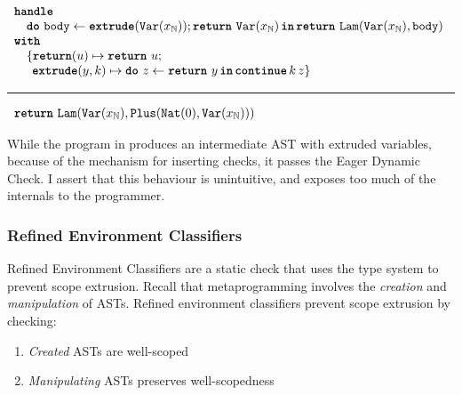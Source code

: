 \begin{code}
  \begin{efflst}
    $\begin{array}{l}
      \textbf{\texttt{handle}} \\
      \quad \texttt{\textbf{do}} \,\, {\texttt{body}} \leftarrow {\textbf{\texttt{extrude}}({\texttt{Var}(x_{\mathbb{N}})}); \texttt{\textbf{return}} \,\, {\texttt{Var}(x_{\mathbb{N}})}} \, \textbf{\texttt{in}} \, {\texttt{\textbf{return}} \,\, {\texttt{Lam}(\texttt{Var}(x_{\mathbb{N}}), \texttt{body})}} \\
      \textbf{\texttt{with}} \\
      \quad \{ \textbf{\texttt{return}}(u) \mapsto \texttt{\textbf{return}} \,\, {u}; \\
      \quad \; \, \textbf{\texttt{extrude}}(y, k) \mapsto { \texttt{\textbf{do}} \,\, {z} \leftarrow {\texttt{\textbf{return}} \,\, {y}} \, \textbf{\texttt{in}} \, {\textbf{\texttt{continue}} \, {k} \, {z}}} \}\\
    \end{array}$

    \vspace{2mm} 
\textcolor{effComment}{\hrule height 0.2mm \relax}
\vspace{2mm} 

\textcolor{effComment}{$\begin{array}{l}\texttt{\textbf{return}} \,\, {\texttt{Lam}(\texttt{Var}(x_{\mathbb{N}}), \texttt{Plus}(\texttt{Nat}({0}), \texttt{Var}(x_{\mathbb{N}})))}\end{array}$}

\end{efflst}
\label{listing:efflang-maybe-not-scope-extrusion}
\end{code}
While the program in  produces an intermediate AST with extruded variables, because of the mechanism for inserting checks, it passes the Eager Dynamic Check. I assert that this behaviour is unintuitive, and exposes too much of the internals to the programmer. 

\subsubsection{Refined Environment Classifiers} 
Refined Environment Classifiers are a static check that uses the type system to prevent scope extrusion. Recall that metaprogramming involves the \textit{creation} and \textit{manipulation} of ASTs. Refined environment classifiers prevent scope extrusion by checking:

\begin{enumerate}
  \item \textit{Created} ASTs are well-scoped
  \item \textit{Manipulating} ASTs preserves well-scopedness 
\end{enumerate}

